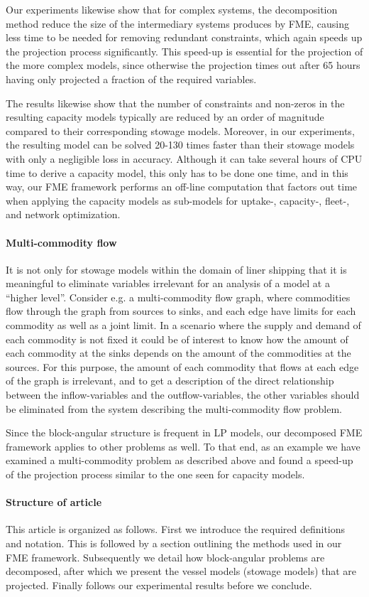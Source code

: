 Our experiments likewise show that for complex systems, the decomposition method reduce the size of the intermediary systems produces by FME, causing less time to be needed for removing redundant constraints, which again speeds up the projection process significantly. This speed-up is essential for the projection of the more complex models, since otherwise the projection times out after 65 hours having only projected a fraction of the required variables.

The results likewise show that the number of constraints and non-zeros in the resulting capacity models typically are reduced by an order of magnitude compared to their corresponding stowage models. Moreover, in our experiments, the resulting model can be solved 20-130 times faster than their stowage models with only a negligible loss in accuracy. Although it can take several hours of CPU time to derive a capacity model, this only has to be done one time, and in this way, our FME framework performs an off-line computation that factors out time when applying the capacity models as sub-models for uptake-, capacity-, fleet-, and network optimization.

\paragraph{Multi-commodity flow}
It is not only for stowage models within the domain of liner shipping that it is meaningful to eliminate variables irrelevant for an analysis of a model at a ``higher level''. Consider e.g. a multi-commodity flow graph, where commodities flow through the graph from sources to sinks, and each edge have limits for each commodity as well as a joint limit. In a scenario where the supply and demand of each commodity is not fixed it could be of interest to know how the amount of each commodity at the sinks depends on the amount of the commodities at the sources. For this purpose, the amount of each commodity that flows at each edge of the graph is irrelevant, and to get a description of the direct relationship between the inflow-variables and the outflow-variables, the other variables should be eliminated from the system describing the multi-commodity flow problem.

Since the block-angular structure is frequent in LP models, our decomposed FME framework applies to other problems as well. To that end, as an example we have examined a multi-commodity problem as described above and found a speed-up of the projection process similar to the one seen for capacity models.

\paragraph{Structure of article}
This article is organized as follows. First we introduce the required definitions and notation. This is followed by a section outlining the methods used in our FME framework. Subsequently we detail how block-angular problems are decomposed, after which we present the vessel models (stowage models) that are projected. Finally follows our experimental results before we conclude.

%

%
